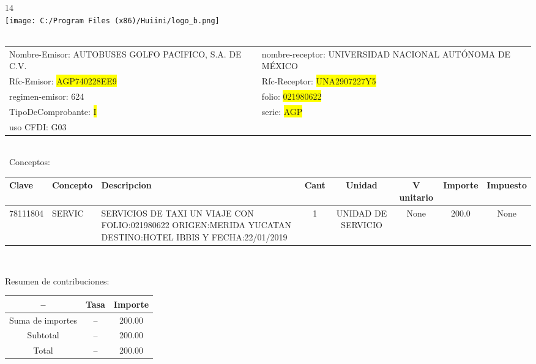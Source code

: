 \documentclass{article}
\begin{document}
\hspace{18cm} 14\\
\texttt{[image: C:/Program Files (x86)/Huiini/logo\_b.png]}
\bigskip\\\
\begin{tabular}{p{11cm}p{1cm}p{8cm}}

Nombre-Emisor: AUTOBUSES GOLFO PACIFICO, S.A. DE C.V. && nombre-receptor: UNIVERSIDAD NACIONAL AUTÓNOMA DE MÉXICO\\

Rfc-Emisor: \colorbox{yellow}{ AGP740228EE9 } & & Rfc-Receptor: \colorbox{yellow}{ UNA2907227Y5 }\\

regimen-emisor: 624 & & folio: \colorbox{yellow}{ 021980622 }\\

TipoDeComprobante: \colorbox{yellow}{ I } & & serie: \colorbox{yellow}{ AGP }\\

uso CFDI: G03\\



\end{tabular}
\bigskip\bigskip\bigskip\\\
Conceptos:\\
\begin{tabular}{|p{1.5cm}|p{3.6cm}|p{3.6cm}|c|c|c|c|c|}
\hline
Clave & Concepto & Descripcion & Cant & Unidad & V unitario & Importe & Impuesto \\
\hline

78111804 & SERVIC & SERVICIOS DE TAXI UN VIAJE CON FOLIO:021980622 ORIGEN:MERIDA YUCATAN   DESTINO:HOTEL IBBIS Y FECHA:22/01/2019 & 1 & UNIDAD DE SERVICIO & None & 200.0 &  None \\
\hline

\end{tabular}\\
\bigskip
\begin{center}
Resumen de contribuciones:\\
\bigskip
\begin{tabular}{|c|c|c|}
\hline
 -- & Tasa & Importe\\
\hline

Suma de importes & -- & 200.00 \\
\hline

Subtotal  & -- & 200.00 \\
\hline

Total  & -- & 200.00 \\
\hline

\end{tabular}
\end{center}
\end{document}
